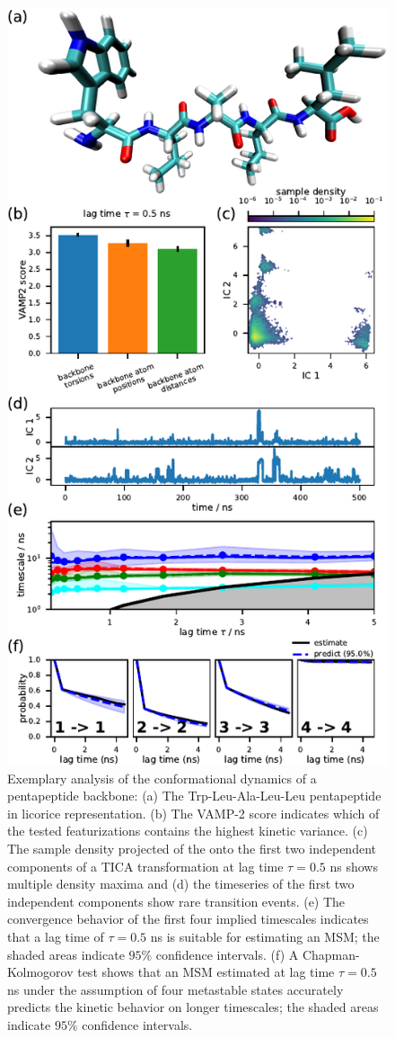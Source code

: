 \documentclass[9pt,tutorial]{livecoms}
\begin{document}
\begin{figure}
\includegraphics{figure_1}
\caption{Exemplary analysis of the conformational dynamics of a pentapeptide backbone: (a) The Trp-Leu-Ala-Leu-Leu pentapeptide in licorice representation. (b) The VAMP-2 score indicates which of the tested featurizations contains the highest kinetic variance. (c) The  sample density projected of the onto the first two independent components of a TICA transformation at lag time $\tau=0.5$ ns shows multiple density maxima and (d) the timeseries of the first two independent components show rare transition events. (e) The convergence behavior of the first four implied timescales indicates that a lag time of $\tau=0.5$ ns is suitable for estimating an MSM; the shaded areas indicate $95\%$ confidence intervals. (f) A Chapman-Kolmogorov test shows that an MSM estimated at lag time $\tau=0.5$ ns under the assumption of four metastable states accurately predicts the kinetic behavior on longer timescales; the shaded areas indicate $95\%$ confidence intervals.}

\end{figure}
\end{document}
